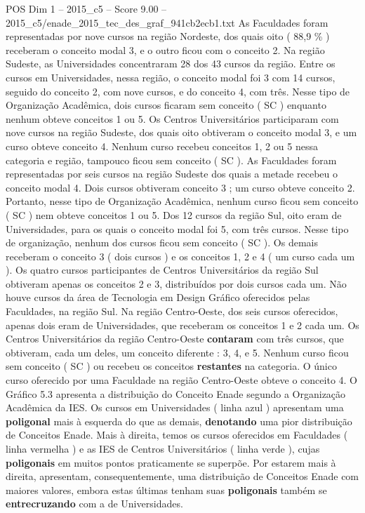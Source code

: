 \begin{textsample}{POS Dim 1 – 2015\_c5 – Score 9.00 – 2015\_c5/enade\_2015\_tec\_des\_graf\_941cb2ecb1.txt}
As Faculdades foram representadas por nove cursos na região Nordeste, dos quais oito ( 88,9 \% ) receberam o conceito modal 3, e o outro ficou com o conceito 2.
Na região Sudeste, as Universidades concentraram 28 dos 43 cursos da região.
Entre os cursos em Universidades, nessa região, o conceito modal foi 3 com 14 cursos, seguido do conceito 2, com nove cursos, e do conceito 4, com três.
Nesse tipo de Organização Acadêmica, dois cursos ficaram sem conceito ( SC ) enquanto nenhum obteve conceitos 1 ou 5.
Os Centros Universitários participaram com nove cursos na região Sudeste, dos quais oito obtiveram o conceito modal 3, e um curso obteve conceito 4.
Nenhum curso recebeu conceitos 1, 2 ou 5 nessa categoria e região, tampouco ficou sem conceito ( SC ).
As Faculdades foram representadas por seis cursos na região Sudeste dos quais a metade recebeu o conceito modal 4.
Dois cursos obtiveram conceito 3 ; um curso obteve conceito 2.
Portanto, nesse tipo de Organização Acadêmica, nenhum curso ficou sem conceito ( SC ) nem obteve conceitos 1 ou 5.
Dos 12 cursos da região Sul, oito eram de Universidades, para os quais o conceito modal foi 5, com três cursos.
Nesse tipo de organização, nenhum dos cursos ficou sem conceito ( SC ).
Os demais receberam o conceito 3 ( dois cursos ) e os conceitos 1, 2 e 4 ( um curso cada um ).
Os quatro cursos participantes de Centros Universitários da região Sul obtiveram apenas os conceitos 2 e 3, distribuídos por dois cursos cada um.
Não houve cursos da área de Tecnologia em Design Gráfico oferecidos pelas Faculdades, na região Sul.
Na região Centro-Oeste, dos seis cursos oferecidos, apenas dois eram de Universidades, que receberam os conceitos 1 e 2 cada um.
Os Centros Universitários da região Centro-Oeste \textbf{contaram} com três cursos, que obtiveram, cada um deles, um conceito diferente : 3, 4, e 5.
Nenhum curso ficou sem conceito ( SC ) ou recebeu os conceitos \textbf{restantes} na categoria.
O único curso oferecido por uma Faculdade na região Centro-Oeste obteve o conceito 4.
O Gráfico 5.3 apresenta a distribuição do Conceito Enade segundo a Organização Acadêmica da IES.
Os cursos em Universidades ( linha azul ) apresentam uma \textbf{poligonal} mais à esquerda do que as demais, \textbf{denotando} uma pior distribuição de Conceitos Enade.
Mais à direita, temos os cursos oferecidos em Faculdades ( linha vermelha ) e as IES de Centros Universitários ( linha verde ), cujas \textbf{poligonais} em muitos pontos praticamente se superpõe.
Por estarem mais à direita, apresentam, consequentemente, uma distribuição de Conceitos Enade com maiores valores, embora estas últimas tenham suas \textbf{poligonais} também se \textbf{entrecruzando} com a de Universidades.

\end{textsample}
